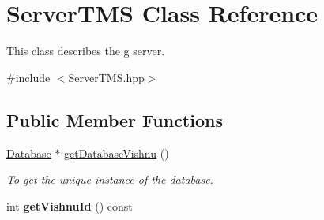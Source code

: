 \hypertarget{classServerTMS}{
\section{ServerTMS Class Reference}
\label{classServerTMS}
}


This class describes the g server.  




{\ttfamily \#include $<$ServerTMS.hpp$>$}

\subsection*{Public Member Functions}
\begin{DoxyCompactItemize}
\item 
\hypertarget{classServerTMS_a1930e69c73d6b558023a105ad5fcc26f}{
\hyperlink{classDatabase}{Database} $\ast$ \hyperlink{classServerTMS_a1930e69c73d6b558023a105ad5fcc26f}{getDatabaseVishnu} ()}
\label{classServerTMS_a1930e69c73d6b558023a105ad5fcc26f}

\begin{DoxyCompactList}\small\item\em To get the unique instance of the database. \item\end{DoxyCompactList}\item 
\hypertarget{classServerTMS_a5fac8b45cc0ae90d910d3c132bb5109f}{
int {\bfseries getVishnuId} () const }
\label{classServerTMS_a5fac8b45cc0ae90d910d3c132bb5109f}


\end{DoxyCompactItemize}
